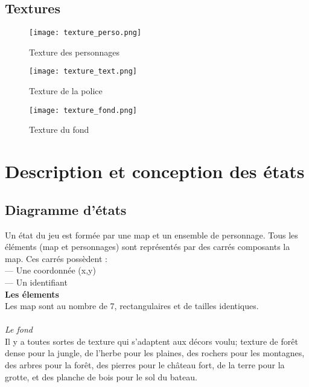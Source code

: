 \documentclass[a4paper,12pt]{report}
\begin{document}
	\newpage
	\section{Textures}
	
	\begin{figure}[h!]
		\centering
		\texttt{[image: texture\_perso.png]}
		\caption{Texture des personnages}
	\end{figure}
	
	\begin{figure}[h!]
		\centering
		\texttt{[image: texture\_text.png]}
		\caption{Texture de la police}
	\end{figure}
	
	\begin{figure}[h!]
		\centering
		\texttt{[image: texture\_fond.png]}
		\caption{Texture du fond}
	\end{figure}
	
	
	
	
	
	\chapter{Description et conception des états}
	
	
	
	
	\section{Diagramme d'états}
	Un état du jeu est formée par une map et un ensemble de personnage. Tous les éléments (map et personnages) sont représentés par des carrés composants la map. Ces carrés possèdent : \\
— Une coordonnée (x,y) \\
— Un identifiant \\ 
	
	\textbf{Les élements} \\
	
	Les map sont au nombre de 7, rectangulaires et de tailles identiques. \\ \\
	\indent \textit{Le fond} \\
	Il y a toutes sortes de texture qui s'adaptent aux décors voulu; texture de forêt dense pour la jungle, de l'herbe pour les plaines, des rochers pour les montagnes, des arbres pour la forêt, des pierres pour le château fort, de la terre pour la grotte, et des planche de bois pour le sol du bateau.\\
	
\end{document}
